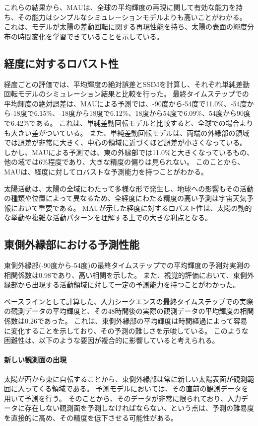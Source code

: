       これらの結果から、MAUは、全球の平均輝度の再現に関して有効な能力を持ち、その能力はシンプルなシミュレーションモデルよりも高いことがわかる。
      これは、モデルが太陽の差動回転に関する再現性能を持ち、太陽の表面の輝度分布の時間変化を学習できていることを示している。
    
    \subsection{経度に対するロバスト性}
      経度ごとの評価では、平均輝度の絶対誤差とSSIMを計算し、それぞれ単純差動回転モデルのシミュレーション結果と比較を行った。
      最終タイムステップでの平均輝度の絶対誤差は、MAUによる予測では、-90度から-54度で11.0\%、-54度から-18度で6.15\%、-18度から18度で6.12\%、18度から54度で6.09\%、54度から90度で6.42\%である。
      これは、単純差動回転モデルと比較すると、全球での場合よりも大きい差がついている。
      また、単純差動回転モデルは、両端の外縁部の領域では誤差が非常に大きく、中心の領域に近づくほど誤差が小さくなっている。
      しかし、MAUによる予測では、東の外縁部では11.0\%と大きくなっているもの、他の域では6\%程度であり、大きな精度の偏りは見られない。
      このことから、MAUは、経度に対してロバストな予測能力を持つことがわかる。
      
      太陽活動は、太陽の全域にわたって多様な形で発生し、地球への影響もその活動の種類や位置によって異なるため、全経度にわたる精度の高い予測は宇宙天気予報において重要である。
      MAUが示した経度に対するロバスト性は、太陽の動的な挙動や複雑な活動パターンを理解する上での大きな利点となる。
      
    \subsection{東側外縁部における予測性能}
      東側外縁部(-90度から-54度)の最終タイムステップでの平均輝度の予測対実測の相関係数は0.98であり、高い相関を示した。
      また、視覚的評価において、東側外縁部から出現する活動領域に対して一定の予測能力を持つことがわかった。

      ベースラインとして計算した、入力シークエンスの最終タイムステップでの実際の観測データの平均輝度と、その48時間後の実際の観測データの平均輝度の相関係数は0.26であった。
      これは、東側外縁部の平均輝度は時間経過によって容易に変化することを示しており、その予測の難しさを示唆している。
      このような困難性は、以下のような要因が複合的に影響していると考えられる。
      \paragraph{新しい観測面の出現}
        太陽が西から東に自転することから、東側外縁部は常に新しい太陽表面が観測範囲に入ってくる領域である。
        予測モデルにおいては、その直前の観測データを用いて予測を行う。
        そのことから、そのデータが非常に限られており、入力データに存在しない観測面を予測しなければならない、という点は、予測の難易度を直接的に高め、その精度を低下させる可能性がある。
